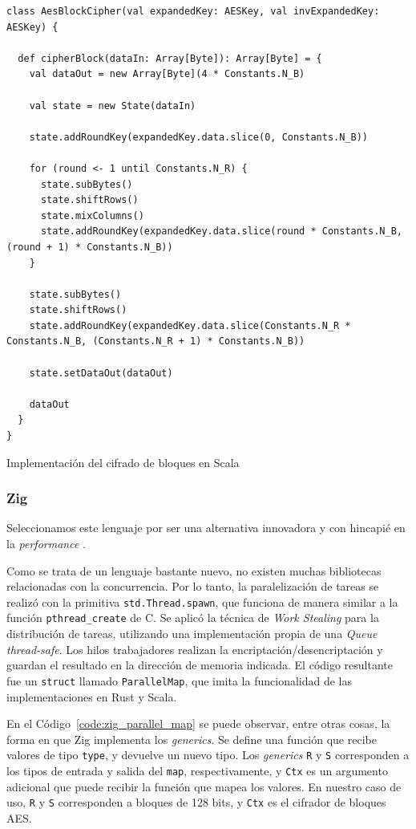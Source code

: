 \documentclass[11pt]{article}
\let\Oldsubsubsection\subsubsection
\renewcommand{\subsubsection}{\FloatBarrier\Oldsubsubsection}
\newcommand{\english}[1]{\textit{#1}}
\begin{document}
\begin{listing}[h]
\begin{verbatim}
class AesBlockCipher(val expandedKey: AESKey, val invExpandedKey: AESKey) {

  def cipherBlock(dataIn: Array[Byte]): Array[Byte] = {
    val dataOut = new Array[Byte](4 * Constants.N_B)

    val state = new State(dataIn)

    state.addRoundKey(expandedKey.data.slice(0, Constants.N_B))

    for (round <- 1 until Constants.N_R) {
      state.subBytes()
      state.shiftRows()
      state.mixColumns()
      state.addRoundKey(expandedKey.data.slice(round * Constants.N_B, (round + 1) * Constants.N_B))
    }

    state.subBytes()
    state.shiftRows()
    state.addRoundKey(expandedKey.data.slice(Constants.N_R * Constants.N_B, (Constants.N_R + 1) * Constants.N_B))

    state.setDataOut(dataOut)

    dataOut
  }
}
\end{verbatim}
\caption{Implementación del cifrado de bloques en Scala}
\label{code:scala:aes_cipher_block}
\end{listing}

\subsubsection{Zig}

Seleccionamos este lenguaje por ser una alternativa innovadora y con hincapié en la \english{performance} \cite{zig:ex:zig_in_100_sec}.

Como se trata de un lenguaje bastante nuevo, no existen muchas bibliotecas relacionadas con la concurrencia. Por lo tanto, la paralelización de tareas se realizó con la primitiva \lstinline{std.Thread.spawn}, que funciona de manera similar a la función \lstinline{pthread_create} de C. Se aplicó la técnica de \english{Work Stealing} para la distribución de tareas, utilizando una implementación propia de una \english{Queue} \english{thread-safe}. Los hilos trabajadores realizan la encriptación/desencriptación y guardan el resultado en la dirección de memoria indicada. El código resultante fue un \lstinline{struct} llamado \lstinline{ParallelMap}, que imita la funcionalidad de las implementaciones en Rust y Scala.

En el Código~\ref{code:zig_parallel_map} se puede observar, entre otras cosas, la forma en que Zig implementa los \english{generics}. Se define una función que recibe valores de tipo \lstinline{type}, y devuelve un nuevo tipo. Los \english{generics} \lstinline{R} y \lstinline{S} corresponden a los tipos de entrada y salida del \lstinline{map}, respectivamente, y \lstinline{Ctx} es un argumento adicional que puede recibir la función que mapea los valores. En nuestro caso de uso, \lstinline{R} y \lstinline{S} corresponden a bloques de 128 bits, y \lstinline{Ctx} es el cifrador de bloques AES. 
\end{document}
